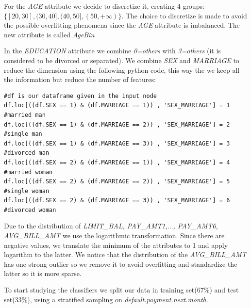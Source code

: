 \documentclass[fleqn,10pt]{SelfArx} %
\begin{document}
	For the \textit{AGE} attribute we decide to discretize it, creating 4 groups: $\{[20,30],(30,40],(40,50],(50,+\infty)\}$.
	The choice to discretize is made to avoid the possible overfitting phenomena since the \textit{AGE} attribute is imbalanced. The new attribute is called \textit{AgeBin}
	
	In the \textit{EDUCATION} attribute we combine \textit{0=others} with \textit{3=others} (it is considered to be divorced or separated).
	We combine \textit{SEX} and \textit{MARRIAGE} to reduce the dimension using the following python code, this way the we keep all the information but reduce the number of features:
	
		
\begin{lstlisting}
#df is our dataframe given in the input node
df.loc[((df.SEX == 1) & (df.MARRIAGE == 1)) , 'SEX_MARRIAGE'] = 1 #married man
df.loc[((df.SEX == 1) & (df.MARRIAGE == 2)) , 'SEX_MARRIAGE'] = 2 #single man
df.loc[((df.SEX == 1) & (df.MARRIAGE == 3)) , 'SEX_MARRIAGE'] = 3 #divorced man
df.loc[((df.SEX == 2) & (df.MARRIAGE == 1)) , 'SEX_MARRIAGE'] = 4 #married woman
df.loc[((df.SEX == 2) & (df.MARRIAGE == 2)) , 'SEX_MARRIAGE'] = 5 #single woman
df.loc[((df.SEX == 2) & (df.MARRIAGE == 3)) , 'SEX_MARRIAGE'] = 6 #divorced woman
\end{lstlisting}
	
	Due to the distribution of \textit{LIMIT\_BAL, PAY\_AMT1,$\hdots$, PAY\_AMT6, AVG\_BILL\_AMT} we use the logarithmic transformation. Since there are negative values, we translate the minimum of the attributes to 1 and apply logarithm to the latter. We notice that the distribution of the \textit{AVG\_BILL\_AMT} has one strong outlier so we remove it to avoid overfitting and standardize the latter so it is more sparse.
	
	To start studying the classifiers we split our data in training set(67\%) and test set(33\%), using a stratified sampling on \textit{default.payment.next.month}.
	
\end{document}
